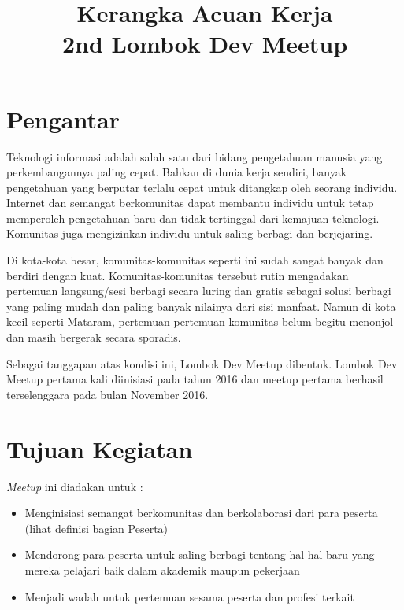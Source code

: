 \documentclass{article}
\begin{document}
\title{Kerangka Acuan Kerja \protect\\2nd Lombok Dev Meetup}
\maketitle
\section{Pengantar}

Teknologi informasi adalah salah satu dari bidang pengetahuan manusia yang perkembangannya paling cepat. Bahkan di dunia kerja sendiri, banyak pengetahuan yang berputar terlalu cepat untuk ditangkap oleh seorang individu. Internet dan semangat berkomunitas dapat membantu individu untuk tetap memperoleh pengetahuan baru dan tidak tertinggal dari kemajuan teknologi. Komunitas juga mengizinkan individu untuk saling berbagi dan berjejaring.

Di kota-kota besar, komunitas-komunitas seperti ini sudah sangat banyak dan berdiri dengan kuat. Komunitas-komunitas tersebut rutin mengadakan pertemuan langsung/sesi berbagi secara luring dan gratis sebagai solusi berbagi yang paling mudah dan paling banyak nilainya dari sisi manfaat. Namun di kota kecil seperti Mataram, pertemuan-pertemuan komunitas belum begitu menonjol dan masih bergerak secara sporadis.

Sebagai tanggapan atas kondisi ini, Lombok Dev Meetup dibentuk. Lombok Dev Meetup pertama kali diinisiasi pada tahun 2016 dan meetup pertama berhasil terselenggara pada bulan November 2016.

\section{Tujuan Kegiatan}

\textit{Meetup} ini diadakan untuk :

\begin{itemize}
  \item Menginisiasi semangat berkomunitas dan berkolaborasi dari para peserta (lihat definisi bagian Peserta)
  \item Mendorong para peserta untuk saling berbagi tentang hal-hal baru yang mereka pelajari baik dalam akademik maupun pekerjaan
  \item Menjadi wadah untuk pertemuan sesama peserta dan profesi terkait
\end{itemize}
\end{document}
